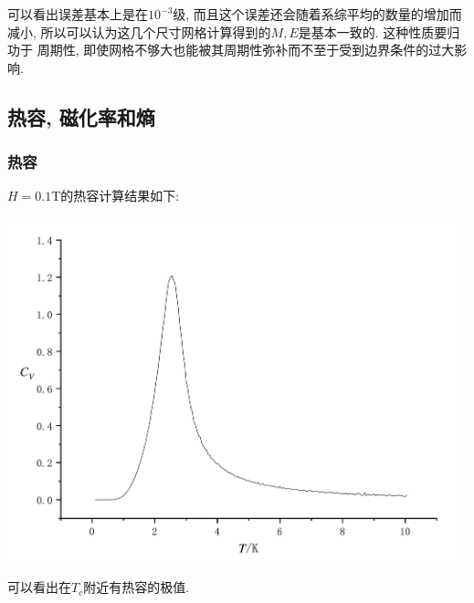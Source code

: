 \documentclass[UTF8]{ctexart}
\begin{document}
\begin{figure}[H]
                    \quad
                \end{figure}
                可以看出误差基本上是在$10^{-3}$级, 而且这个误差还会随着系综平均的数量的增加而减小, 所以可以认为这几个尺寸网格计算得到的$M, E$是基本一致的. 这种性质要归功于
                周期性, 即使网格不够大也能被其周期性弥补而不至于受到边界条件的过大影响.
                \newpage
        \subsection{热容, 磁化率和熵}
            \subsubsection{热容}
                \indent $H=0.1$T的热容计算结果如下:
                \begin{center}
                    \includegraphics[width=13cm]{Cv-T.pdf}
                \end{center}
                可以看出在$T_c$附近有热容的极值.
\end{document}

